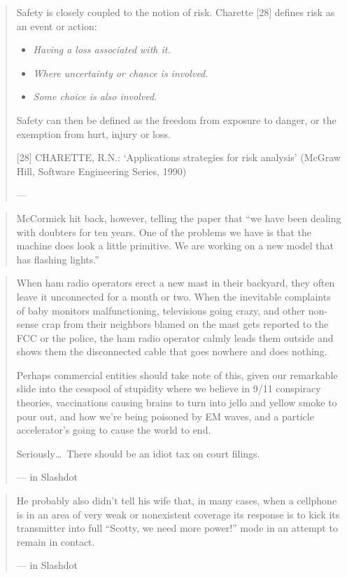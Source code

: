 \documentclass[a4paper]{article}
\begin{document}
\medskip
\begin{quote}
	Safety is closely coupled to the notion of risk.  Charette
	[28] defines risk as an event or action:
	\begin{itemize}
		\item {\it Having a loss associated with it.}
		\item {\it Where uncertainty or chance is involved.}
		\item {\it Some choice is also involved.}
	\end{itemize}
	Safety can then be defined as the freedom from exposure to danger,
	or the exemption from hurt, injury or loss.

	[28] CHARETTE, R.N.: `Applications strategies for risk analysis' (McGraw
	Hill, Software Engineering Series, 1990)

	---\citet[p.~2]{Bowen1993}
\end{quote}

\medskip
\begin{quote}
	McCormick hit back, however, telling the paper that ``we have been
	dealing with doubters for ten years. One of the problems we have
	is that the machine does look a little primitive. We are working on
	a new model that has flashing lights.''

	\citet{deBruxelles2010}
\end{quote}

\medskip
\begin{quote}
When ham radio operators erect a new mast in their backyard, they often
leave it unconnected for a month or two. When the inevitable complaints
of baby monitors malfunctioning, televisions going crazy, and other
non-sense crap from their neighbors blamed on the mast gets reported to
the FCC or the police, the ham radio operator calmly leads them outside
and shows them the disconnected cable that goes nowhere and does nothing.

Perhaps commercial entities should take note of this, given our remarkable
slide into the cesspool of stupidity where we believe in 9/11 conspiracy
theories, vaccinations causing brains to turn into jello and yellow smoke
to pour out, and how we're being poisoned by EM waves, and a particle
accelerator's going to cause the world to end.

Seriously\ldots\ There should be an idiot tax on court filings.

---\citet{girlintraining2010} in Slashdot
\end{quote}

\medskip
\begin{quote}
	He probably also didn't tell his wife that, in many cases, when a
	cellphone is in an area of very weak or nonexistent coverage its
	response is to kick its transmitter into full ``Scotty, we need
	more power!'' mode in an attempt to remain in contact.

	---\citet{fuzzy2010} in Slashdot
\end{quote}
\end{document}

